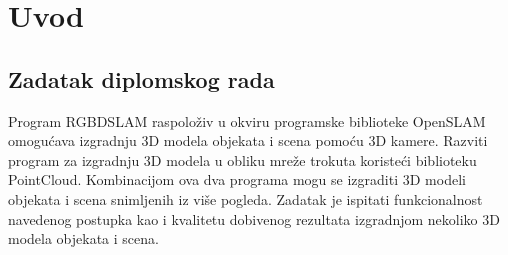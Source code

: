 \newpage

\setcounter{page}{1}
\setcounter{figure}{0}
\section{Uvod}%
\label{sec:Uvod}

\subsection{Zadatak diplomskog rada} %
\label{ssub:Zadatak diplomskog rada}

Program RGBDSLAM raspoloživ u okviru programske biblioteke OpenSLAM
omogućava izgradnju 3D modela objekata i scena pomoću 3D kamere.
Razviti program za izgradnju 3D modela u obliku mreže trokuta koristeći
biblioteku PointCloud. Kombinacijom ova dva programa mogu se izgraditi
3D modeli objekata i scena snimljenih iz više pogleda. Zadatak je
ispitati funkcionalnost navedenog postupka kao i kvalitetu dobivenog
rezultata izgradnjom nekoliko 3D modela objekata i scena.

